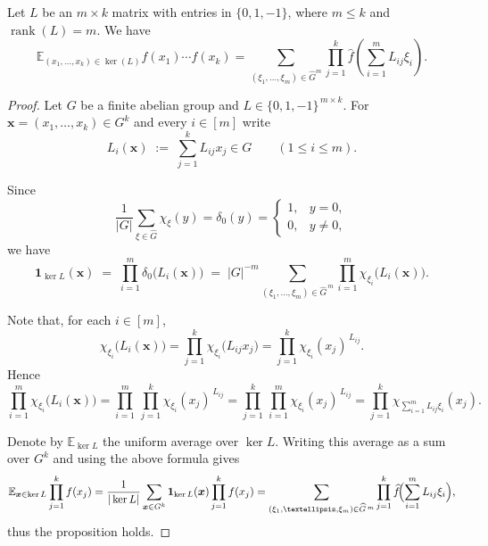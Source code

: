\documentclass[10pt,a4paper]{amsart}
\begin{document}
\begin{prop}\label{matrix}
Let $L$ be an $m \times k$ matrix with entries in $\{0, 1, -1\}$, where $m \leq k$ and $\operatorname{rank}(L) = m$. We have
\[
\mathbb{E}_{(x_1, \dots, x_k) \in \ker(L)} f(x_1) \cdots f(x_k) = \sum_{(\xi_1, \dots, \xi_m) \in \widehat{G}^m} \prod_{j=1}^k \widehat{f} \left( \sum_{i=1}^m L_{ij} \xi_i \right).
\]
\end{prop}

\begin{proof}
Let $G$ be a finite abelian group and $L\in\{0,1,-1\}^{\,m\times k}$.
For $\boldsymbol{x}=(x_1,\dots,x_k)\in G^{k}$ and every $i\in [m]$ write
\[
   L_i(\boldsymbol{x}) \;:=\; \sum_{j=1}^{k} L_{ij}x_j \in G
   \qquad(1\le i\le m).
\]

Since 
\[
\frac{1}{|G|}\sum_{\xi\in\widehat{G}}\chi_{\xi}(y)
=\delta_{0}(y)
=\begin{cases}
1, & y = 0,\\[2pt]
0, & y \neq 0,
\end{cases}
\]
we have
\[
   \mathbf 1_{\ker L}(\boldsymbol{x})
   \;=\;
   \prod_{i=1}^{m}\delta_{0}\!\bigl(L_i(\boldsymbol{x})\bigr)
   \;=\;
   |G|^{-m}
   \sum_{(\xi_1,\dots,\xi_m)\in\widehat{G}^{\,m}}
   \prod_{i=1}^{m}\chi_{\xi_i}\bigl(L_i(\boldsymbol{x})\bigr).
\]

Note that, for each $i\in[m]$,
\[
   \chi_{\xi_i}\!\bigl(L_i(\boldsymbol{x})\bigr)
   = \prod_{j=1}^{k}\chi_{\xi_i}\!\bigl(L_{ij}x_j\bigr)
   = \prod_{j=1}^{k}\chi_{\xi_i}(x_j)^{\,L_{ij}}.
\]
Hence
\[
   \prod_{i=1}^{m}\chi_{\xi_i}\!\bigl(L_i(\boldsymbol{x})\bigr)
   = \prod_{i=1}^{m}\,\prod_{j=1}^{k}\chi_{\xi_i}(x_j)^{\,L_{ij}}
   = \prod_{j=1}^{k}\,\prod_{i=1}^{m}\chi_{\xi_i}(x_j)^{\,L_{ij}}
   = \prod_{j=1}^{k}\chi_{\sum_{i=1}^{m}L_{ij}\xi_i}(x_j).
\]

Denote by $\mathbb{E}_{\ker L}$ the uniform average over $\ker L$.
Writing this average as a sum over $G^{k}$ and using the above formula gives
\[
   \mathbb{E}_{\boldsymbol{x}\in\ker L}\prod_{j=1}^{k}f(x_j)
   =\frac{1}{|\ker L|}\sum_{\boldsymbol{x}\in G^{k}}
      \mathbf 1_{\ker L}(\boldsymbol{x})\prod_{j=1}^{k}f(x_j)
   =\sum_{(\xi_1,\dots,\xi_m)\in\widehat{G}^{\,m}}
     \prod_{j=1}^{k}\widehat f\!\Bigl(\sum_{i=1}^{m}L_{ij}\xi_i\Bigr),
\]
thus the proposition holds.

\end{proof}
\end{document}
